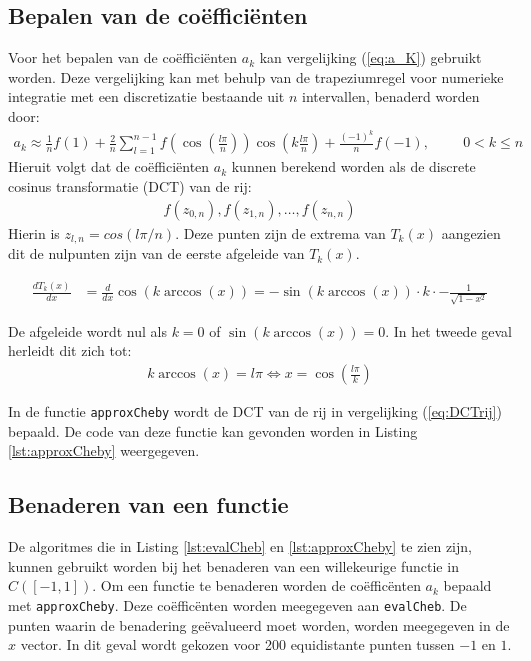 \documentclass[a4paper, 12pt, titlepage, fleqn]{article}
\begin{document}
\subsection{Bepalen van de co\"effici\"enten}
Voor het bepalen van de co\"effici\"enten $a_k$ kan vergelijking (\ref{eq:a_K}) gebruikt worden. Deze vergelijking kan met behulp van de trapeziumregel voor numerieke integratie met een discretizatie bestaande uit $n$ intervallen, benaderd worden door:
\begin{align*}
a_k \approx \frac{1}{n}f(1) + \frac{2}{n}\sum_{l=1}^{n-1}f\left(\cos\left(\frac{l\pi}{n}\right)\right)\cos\left(k\frac{l\pi}{n}\right) + \frac{(-1)^k}{n}f(-1), \hspace{1cm} 0 < k \leq n
\end{align*}
Hieruit volgt dat de co\"effici\"enten $a_k$ kunnen berekend worden als de discrete cosinus transformatie (DCT) van de rij:
\begin{align}
f(z_{0,n}),f(z_{1,n}), \ldots, f(z_{n,n})
\label{eq:DCTrij}
\end{align} 
Hierin is $z_{l,n} = cos(l\pi/n)$. Deze punten zijn de extrema van $T_k(x)$ aangezien dit de nulpunten zijn van de eerste afgeleide van $T_k(x)$.

\begin{align*}
\frac{dT_k(x)}{dx} &= \frac{d}{dx}\cos(k\arccos(x)) = -\sin(k \arccos(x))\cdot k \cdot - \frac{1}{\sqrt{1-x^2}}
\end{align*}

De afgeleide wordt nul als $k=0$ of $\sin(k \arccos(x)) = 0$. In het tweede geval herleidt dit zich tot:
\begin{align*}
k\arccos(x) = l\pi \Leftrightarrow x = \cos\left(\frac{l\pi}{k}\right)
\end{align*}

In de functie \texttt{approxCheby} wordt de DCT van de rij in vergelijking (\ref{eq:DCTrij}) bepaald. De code van deze functie kan gevonden worden in Listing \ref{lst:approxCheby} weergegeven.




\subsection{Benaderen van een functie}
De algoritmes die in Listing \ref{lst:evalCheb} en \ref{lst:approxCheby} te zien zijn, kunnen gebruikt worden bij het benaderen van een willekeurige functie in $C([-1,1])$. Om een functie te benaderen worden de co\"effic\"enten $a_k$ bepaald met \texttt{approxCheby}. Deze co\"effic\"enten worden meegegeven aan \texttt{evalCheb}. De punten waarin de benadering ge\"evalueerd moet worden, worden meegegeven in de $x$ vector. In dit geval wordt gekozen voor 200 equidistante punten tussen $-1$ en $1$.
\end{document}
